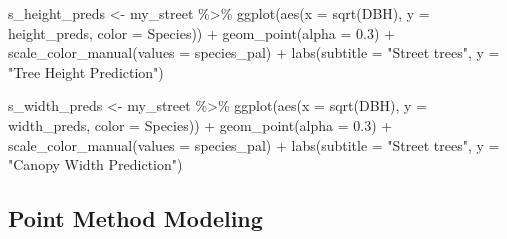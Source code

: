 \documentclass[12pt,twoside]{reedthesis}
\newenvironment{Shaded}{\begin{snugshade}}{\end{snugshade}}
\newcommand{\AttributeTok}[1]{\textcolor[rgb]{0.77,0.63,0.00}{#1}}
\newcommand{\FloatTok}[1]{\textcolor[rgb]{0.00,0.00,0.81}{#1}}
\newcommand{\FunctionTok}[1]{\textcolor[rgb]{0.00,0.00,0.00}{#1}}
\newcommand{\NormalTok}[1]{#1}
\newcommand{\OtherTok}[1]{\textcolor[rgb]{0.56,0.35,0.01}{#1}}
\newcommand{\SpecialCharTok}[1]{\textcolor[rgb]{0.00,0.00,0.00}{#1}}
\newcommand{\StringTok}[1]{\textcolor[rgb]{0.31,0.60,0.02}{#1}}
\begin{document}
\begin{Shaded}
\begin{Highlighting}[]
\NormalTok{s\_height\_preds }\OtherTok{\textless{}{-}}\NormalTok{ my\_street }\SpecialCharTok{\%\textgreater{}\%}
    \FunctionTok{ggplot}\NormalTok{(}\FunctionTok{aes}\NormalTok{(}\AttributeTok{x =} \FunctionTok{sqrt}\NormalTok{(DBH), }\AttributeTok{y =}\NormalTok{ height\_preds, }\AttributeTok{color =}\NormalTok{ Species)) }\SpecialCharTok{+}
    \FunctionTok{geom\_point}\NormalTok{(}\AttributeTok{alpha =} \FloatTok{0.3}\NormalTok{) }\SpecialCharTok{+} \FunctionTok{scale\_color\_manual}\NormalTok{(}\AttributeTok{values =}\NormalTok{ species\_pal) }\SpecialCharTok{+}
    \FunctionTok{labs}\NormalTok{(}\AttributeTok{subtitle =} \StringTok{"Street trees"}\NormalTok{, }\AttributeTok{y =} \StringTok{"Tree Height Prediction"}\NormalTok{)}

\NormalTok{s\_width\_preds }\OtherTok{\textless{}{-}}\NormalTok{ my\_street }\SpecialCharTok{\%\textgreater{}\%}
    \FunctionTok{ggplot}\NormalTok{(}\FunctionTok{aes}\NormalTok{(}\AttributeTok{x =} \FunctionTok{sqrt}\NormalTok{(DBH), }\AttributeTok{y =}\NormalTok{ width\_preds, }\AttributeTok{color =}\NormalTok{ Species)) }\SpecialCharTok{+}
    \FunctionTok{geom\_point}\NormalTok{(}\AttributeTok{alpha =} \FloatTok{0.3}\NormalTok{) }\SpecialCharTok{+} \FunctionTok{scale\_color\_manual}\NormalTok{(}\AttributeTok{values =}\NormalTok{ species\_pal) }\SpecialCharTok{+}
    \FunctionTok{labs}\NormalTok{(}\AttributeTok{subtitle =} \StringTok{"Street trees"}\NormalTok{, }\AttributeTok{y =} \StringTok{"Canopy Width Prediction"}\NormalTok{)}
\end{Highlighting}
\end{Shaded}
\hypertarget{point-method-modeling}{%
\subsection*{Point Method Modeling}\label{point-method-modeling}}
\end{document}
